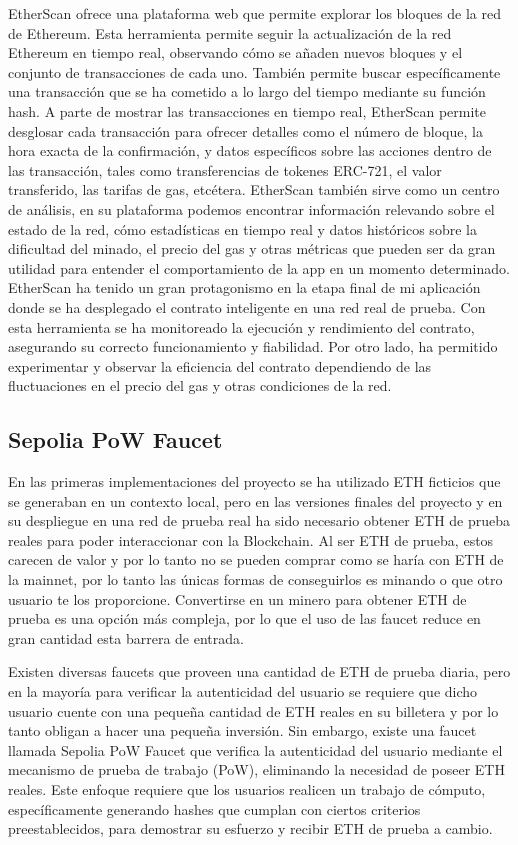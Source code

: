 EtherScan ofrece una plataforma web que permite explorar los bloques de la red de Ethereum.
Esta herramienta permite seguir la actualización de la red Ethereum en tiempo real, observando cómo se añaden nuevos bloques y el conjunto de transacciones de cada uno. También permite buscar específicamente una transacción que se ha cometido a lo largo del tiempo mediante su función hash.
A parte de mostrar las transacciones en tiempo real, EtherScan permite desglosar cada transacción para ofrecer detalles como el número de bloque, la hora exacta de la confirmación, y datos específicos sobre las acciones dentro de las transacción, tales como transferencias de tokenes ERC-721, el valor transferido, las tarifas de gas, etcétera.
EtherScan también sirve como un centro de análisis, en su plataforma podemos encontrar información relevando sobre el estado de la red, cómo estadísticas en tiempo real y datos históricos sobre la dificultad del minado, el precio del gas y otras métricas que pueden ser da gran utilidad para entender el comportamiento de la app en un momento determinado.
EtherScan ha tenido un gran protagonismo en la etapa final de mi aplicación donde se ha desplegado el contrato inteligente en una red real de prueba.
Con esta herramienta se ha monitoreado la ejecución y rendimiento del contrato, asegurando su correcto funcionamiento y fiabilidad.
Por otro lado, ha permitido experimentar y observar la eficiencia del contrato dependiendo de las fluctuaciones en el precio del gas y otras condiciones de la red.


\subsection{Sepolia PoW Faucet}

En las primeras implementaciones del proyecto se ha utilizado ETH ficticios que se generaban en un contexto local, pero en las versiones finales del proyecto y en su despliegue en una red de prueba real ha sido necesario obtener ETH de prueba reales para poder interaccionar con la Blockchain.
Al ser ETH de prueba, estos carecen de valor y por lo tanto no se pueden comprar como se haría con ETH de la mainnet, por lo tanto las únicas formas de conseguirlos es minando o que otro usuario te los proporcione.
Convertirse en un minero para obtener ETH de prueba es una opción más compleja, por lo que el uso de las faucet reduce en gran cantidad esta barrera de entrada.

Existen diversas faucets que proveen una cantidad de ETH de prueba diaria, pero en la mayoría para verificar la autenticidad del usuario se requiere que dicho usuario cuente con una pequeña cantidad de ETH reales en su billetera y por lo tanto obligan a hacer una pequeña inversión.
Sin embargo, existe una faucet llamada Sepolia PoW Faucet que verifica la autenticidad del usuario mediante el mecanismo de prueba de trabajo (PoW), eliminando la necesidad de poseer ETH reales.
Este enfoque requiere que los usuarios realicen un trabajo de cómputo, específicamente generando hashes que cumplan con ciertos criterios preestablecidos, para demostrar su esfuerzo y recibir ETH de prueba a cambio. 


